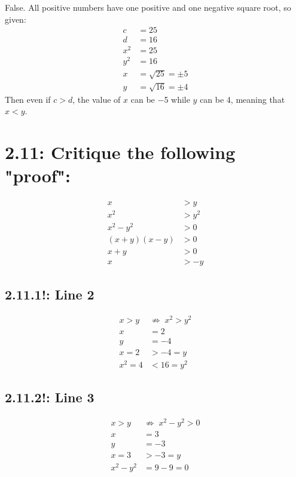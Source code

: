 \documentclass{article}
\begin{document}
False. All positive numbers have one positive and one negative square root, so given:
\begin{align*}
  c&=25\\
  d&=16\\
  x^2&=25\\
  y^2&=16\\
  x&=\sqrt{25}=\pm5\\
  y&=\sqrt{16}=\pm4
\end{align*}
Then even if $c>d$, the value of $x$ can be $-$5 while $y$ can be 4, meaning that $x<y$.

\section*{2.11: Critique the following "proof":} %

\begin{align*}
  x&>y\\
  x^2&>y^2\\
  x^2-y^2&>0\\
  (x+y)(x-y)&>0\\
  x+y&>0\\
  x&>-y
\end{align*}

\subsection*{2.11.1!: Line 2}

\begin{align*}
  x>y\;&{\not\Rightarrow}\;x^2>y^2\\
  x&=2\\
  y&=-4\\
  x=2&>-4=y\\
  x^2=4&<16=y^2
\end{align*}

\subsection*{2.11.2!: Line 3}

\begin{align*}
  x>y\;&{\not\Rightarrow}\;x^2-y^2>0\\
  x&=3\\
  y&=-3\\
  x=3&>-3=y\\
  x^2-y^2&=9-9=0
\end{align*}
\end{document}
